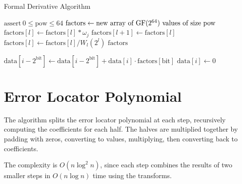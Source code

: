 \begin{algorithm}
    \caption{Formal Derivative Algorithm}
    \begin{algorithmic}
            \State $\text{assert}\ 0 \leq \text{pow} \le 64$
            \State $\text{factors} \gets \text{new array of $\text{GF}(2^{64})$ values of size } \text{pow}$
                    \State $\text{factors}[l] \gets \text{factors}[l] * \omega_j$
                \EndFor
                    \State $\text{factors}[l + 1] \gets \text{factors}[l]$
                \EndIf
                \State $\text{factors}[l] \gets \text{factors}[l] / W_l(2^l)$
            \EndFor
            \State \Return $\text{factors}$
        \EndFunction
    \end{algorithmic}
    \begin{algorithmic}
                        \State $\text{data}[i - 2^{\text{bit}}] \gets \text{data}[i - 2^{\text{bit}}] + \text{data}[i] \cdot \text{factors}[\text{bit}]$
                    \EndIf
                \EndFor
                \State $\text{data}[i] \gets 0$
            \EndFor
        \EndFunction
    \end{algorithmic}
\end{algorithm}

\clearpage

\section{Error Locator Polynomial}
\label{appendix:locator}

The algorithm splits the error locator polynomial at each step, recursively computing the coefficients for each half.
The halves are multiplied together by padding with zeros, converting to values, multiplying, then converting back to coefficients.

The complexity is $O(n \log^2 n)$, since each step combines the results of two smaller steps in $O(n \log n)$ time using the transforms.

